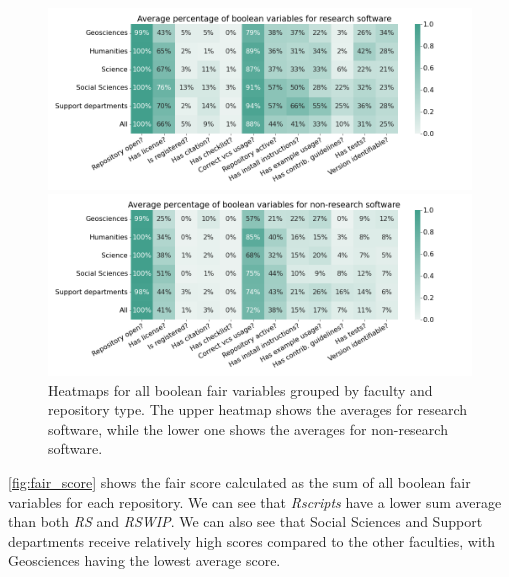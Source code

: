 \begin{figure}[h!]
\centerline{
\includegraphics[scale=0.53]{figures_results/heatmap_fair_booleans.png}}
\vspace{-0.5cm}
\centerline{
\includegraphics[scale=0.53]{figures_results/heatmap_fair_booleans_non_rs.png}}

\caption{Heatmaps for all boolean \acrshort{fair} variables grouped by faculty and repository type. The upper heatmap shows the averages for research software, while the lower one shows the averages for non-research software.
\label{fig:heatmap_fair_booleans}}
\end{figure}

\newpage
\autoref{fig:fair_score} shows the \acrshort{fair} score calculated as the sum of all boolean \acrshort{fair} variables for each repository. We can see that \textit{Rscripts} have a lower sum average than both \textit{RS} and \textit{RSWIP}. We can also see that Social Sciences and Support departments receive relatively high scores compared to the other faculties, with Geosciences having the lowest average score.

